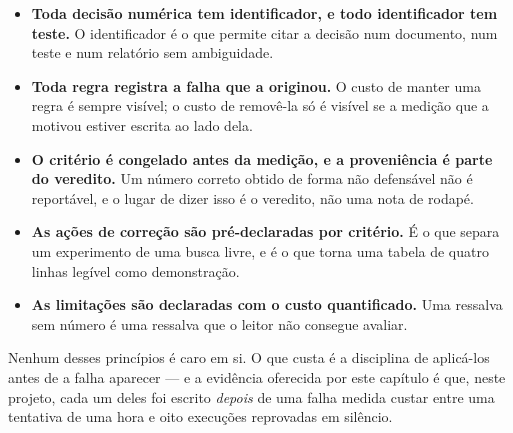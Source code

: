 \begin{itemize}
    \item \textbf{Toda decisão numérica tem identificador, e todo identificador
          tem teste.} O identificador é o que permite citar a decisão num
          documento, num teste e num relatório sem ambiguidade.
    \item \textbf{Toda regra registra a falha que a originou.} O custo de manter
          uma regra é sempre visível; o custo de removê-la só é visível se a
          medição que a motivou estiver escrita ao lado dela.
    \item \textbf{O critério é congelado antes da medição, e a proveniência é
          parte do veredito.} Um número correto obtido de forma não defensável
          não é reportável, e o lugar de dizer isso é o veredito, não uma nota de
          rodapé.
    \item \textbf{As ações de correção são pré-declaradas por critério.} É o que
          separa um experimento de uma busca livre, e é o que torna uma tabela de
          quatro linhas legível como demonstração.
    \item \textbf{As limitações são declaradas com o custo quantificado.} Uma
          ressalva sem número é uma ressalva que o leitor não consegue avaliar.
\end{itemize}

Nenhum desses princípios é caro em si. O que custa é a disciplina de aplicá-los
antes de a falha aparecer --- e a evidência oferecida por este capítulo é que,
neste projeto, cada um deles foi escrito \textit{depois} de uma falha medida
custar entre uma tentativa de uma hora e oito execuções reprovadas em silêncio.
